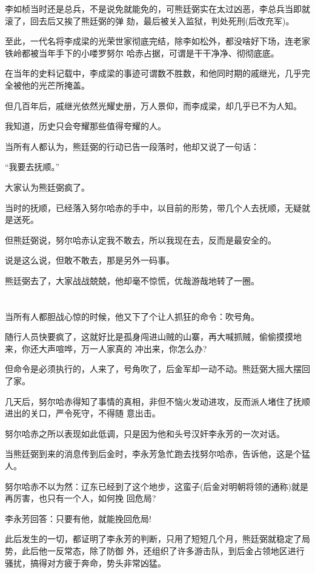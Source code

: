 \documentclass[11pt,a4paper,onecolumn]{article}
\begin{document}
李如桢当时还是总兵，不是说免就能免的，可熊廷弼实在太过凶恶，李总兵当即就滚了，回去后又挨了熊廷弼的弹
劾，最后被关入监狱，判处死刑(后改充军)。

至此，一代名将李成梁的光荣世家彻底完结，除李如松外，都没啥好下场，连老家铁岭都被当年手下的小喽罗努尔
哈赤占据，可谓是干干净净、彻彻底底。

在当年的史料记载中，李成梁的事迹可谓数不胜数，和他同时期的戚继光，几乎完全被他的光芒所掩盖。

但几百年后，戚继光依然光耀史册，万人景仰，而李成梁，却几乎已不为人知。

我知道，历史只会夸耀那些值得夸耀的人。

当所有人都认为，熊廷弼的行动已告一段落时，他却又说了一句话：

``我要去抚顺。''

大家认为熊廷弼疯了。

当时的抚顺，已经落入努尔哈赤的手中，以目前的形势，带几个人去抚顺，无疑就是送死。

但熊廷弼说，努尔哈赤认定我不敢去，所以我现在去，反而是最安全的。

说是这么说，但敢不敢去，那是另外一码事。

熊廷弼去了，大家战战兢兢，他却毫不惊慌，优哉游哉地转了一圈。

\section[\thesection]{}

当所有人都胆战心惊的时候，他又下了个让人抓狂的命令：吹号角。

随行人员快要疯了，这就好比是孤身闯进山贼的山寨，再大喊抓贼，偷偷摸摸地来，你还大声喧哗，万一人家真的
冲出来，你怎么办?

但命令是必须执行的，人来了，号角吹了，后金军却一动不动。熊廷弼大摇大摆回了家。

几天后，努尔哈赤得知了事情的真相，非但不恼火发动进攻，反而派人堵住了抚顺进出的关口，严令死守，不得随
意出击。

努尔哈赤之所以表现如此低调，只是因为他和头号汉奸李永芳的一次对话。

当熊廷弼到来的消息传到后金时，李永芳急忙跑去找努尔哈赤，告诉他，这是个猛人。

努尔哈赤不以为然：辽东已经到了这个地步，这蛮子(后金对明朝将领的通称)就是再厉害，也只有一个人，如何挽
回危局?

李永芳回答：只要有他，就能挽回危局!

此后发生的一切，都证明了李永芳的判断，只用了短短几个月，熊廷弼就稳定了局势，此后他一反常态，除了防御
外，还组织了许多游击队，到后金占领地区进行骚扰，搞得对方疲于奔命，势头非常凶猛。
\end{document}
